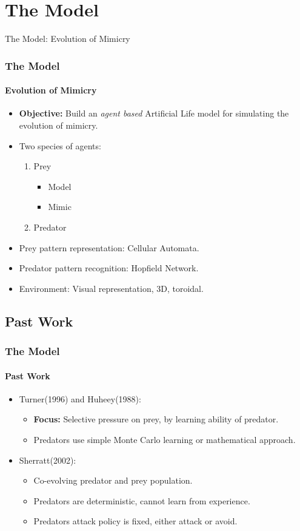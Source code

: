 \section{The Model}

\frame
{
	\begin{center}
		\LARGE The Model: Evolution of Mimicry
	\end{center}
}

\frame
{
	\frametitle{The Model}
	\framesubtitle{Evolution of Mimicry}
	
	\begin{itemize}
		\item \textbf{Objective:} Build an \textit{agent based} Artificial Life model for simulating the evolution of mimicry.	
		\item Two species of agents:
			\begin{enumerate}
				\item Prey
					\begin{itemize}
						\item Model
						\item Mimic
					\end{itemize}
				\item Predator
			\end{enumerate}
		\item Prey pattern representation: Cellular Automata.
		\item Predator pattern recognition: Hopfield Network.
		\item Environment: Visual representation, 3D, toroidal.
	\end{itemize}	
}

\subsection{Past Work}

\frame
{
	\frametitle{The Model}
	\framesubtitle{Past Work}

	\begin{itemize}
		\item Turner(1996) and Huheey(1988):
			\begin{itemize}
				\item \textbf{Focus:} Selective pressure on prey, by learning ability of predator.
				\item Predators use simple Monte Carlo learning or mathematical approach.
			\end{itemize}
		\item Sherratt(2002):
			\begin{itemize}
				\item Co-evolving predator and prey population.
				\item Predators are deterministic, cannot learn from experience.
				\item Predators attack policy is fixed, either attack or avoid.
			\end{itemize}
	\end{itemize}
}

